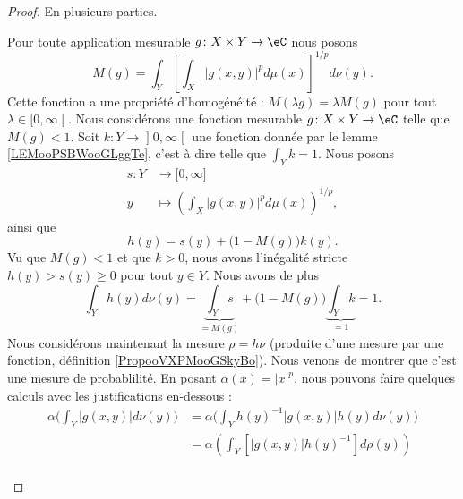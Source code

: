 \begin{proof}
	En plusieurs parties.
	\begin{subproof}
		\spitem[La fonction \( M\)]
		Pour toute application mesurable \( g\colon X\times Y\to \eC\) nous posons
		\begin{equation}
			M(g)=\int_Y \left[ \int_X| g(x,y) |^pd\mu(x) \right]^{1/p}d\nu(y).
		\end{equation}
		Cette fonction a une propriété d'homogénéité : \( M(\lambda g)=\lambda M(g)\) pour tout \( \lambda\in \mathopen[ 0 , \infty \mathclose[\).
			\spitem[Si \(  M(g)<1 \)]
			Nous considérons une fonction mesurable \( g\colon X\times Y\to \eC\) telle que \( M(g)<1\). Soit \( k\colon Y\to \mathopen] 0 , \infty \mathclose[\) une fonction donnée par le lemme \ref{LEMooPSBWooGLggTe}, c'est à dire telle que \( \int_Yk=1\). Nous posons
		\begin{equation}
			\begin{aligned}
				s\colon Y & \to \mathopen[ 0 , \infty \mathclose]                   \\
				y         & \mapsto \left( \int_X| g(x,y) |^pd\mu(x) \right)^{1/p},
			\end{aligned}
		\end{equation}
		ainsi que
		\begin{equation}
			h(y)=s(y)+\big(1-M(g)\big)k(y).
		\end{equation}
		Vu que \( M(g)<1\) et que \( k>0\), nous avons l'inégalité stricte \( h(y)>s(y)\geq 0\) pour tout \( y\in Y\). Nous avons de plus
		\begin{equation}
			\int_Y h(y)d\nu(y)=\underbrace{\int_Ys}_{=M(g)}+\big( 1-M(g) \big)\underbrace{\int_Yk}_{=1}=1.
		\end{equation}
		Nous considérons maintenant la mesure \( \rho=h\nu\) (produite d'une mesure par une fonction, définition \ref{PropooVXPMooGSkyBo}). Nous venons de montrer que c'est une mesure de probablilité. En posant \( \alpha(x)=| x |^p\), nous pouvons faire quelques calculs avec les justifications en-dessous :
		\begin{subequations}        \label{SUBEQSooPPZIooSEDcpS}
			\begin{align}
				\alpha\big( \int_Y|g(x,y)|d\nu(y)\big) & =\alpha\big( \int_Yh(y)^{-1}|g(x,y)|h(y)d\nu(y)\big)                                     \\
				                                       & =\alpha\left( \int_Y [|g(x,y)|h(y)^{-1}]d\rho(y) \right)                                 \\

\end{align}
\end{subequations}
\end{subproof}
\end{proof}
